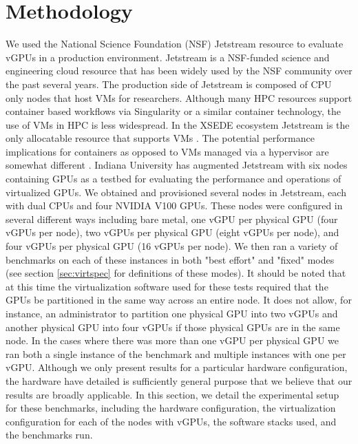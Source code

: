\documentclass[acmtog, authorversion]{acmart}
\begin{document}
\section{Methodology} \label{sec:method}
We used the National Science Foundation (NSF) Jetstream resource \cite{jetstream1, jetstream2} to evaluate vGPUs in a production environment. Jetstream is a NSF-funded science and engineering cloud resource that has been widely used by the NSF community over the past several years. The production side of Jetstream is composed of CPU only nodes that host VMs for researchers. Although many HPC resources support container based workflows via Singularity or a similar container technology, the use of VMs in HPC is less widespread. In the XSEDE ecosystem Jetstream is the only allocatable resource that supports VMs \cite{xsederesources}. The potential performance implications for containers as opposed to VMs managed via a hypervisor are somewhat different \cite{containers}. Indiana University has augmented Jetstream with six nodes containing GPUs as a testbed for evaluating the performance and operations of virtualized GPUs. We obtained and provisioned several nodes in Jetstream, each with dual CPUs and four NVIDIA V100 GPUs. These nodes were configured in several different ways including bare metal, one vGPU per physical GPU (four vGPUs per node), two vGPUs per physical GPU (eight vGPUs per node), and four vGPUs per physical GPU (16 vGPUs per node). We then ran a variety of benchmarks on each of these instances in both "best effort" and "fixed" modes (see section \ref{sec:virtspec} for definitions of these modes). It should be noted that at this time the virtualization software used for these tests required that the GPUs be partitioned in the same way across an entire node. It does not allow, for instance, an administrator to partition one physical GPU into two vGPUs and another physical GPU into four vGPUs if those physical GPUs are in the same node. In the cases where there was more than one vGPU per physical GPU we ran both a single instance of the benchmark and multiple instances with one per vGPU. Although we only present results for a particular hardware configuration, the hardware have detailed is sufficiently general purpose that we believe that our results are broadly applicable. In this section, we detail the experimental setup for these benchmarks, including the hardware configuration, the virtualization configuration for each of the nodes with vGPUs, the software stacks used, and the benchmarks run.
\end{document}
